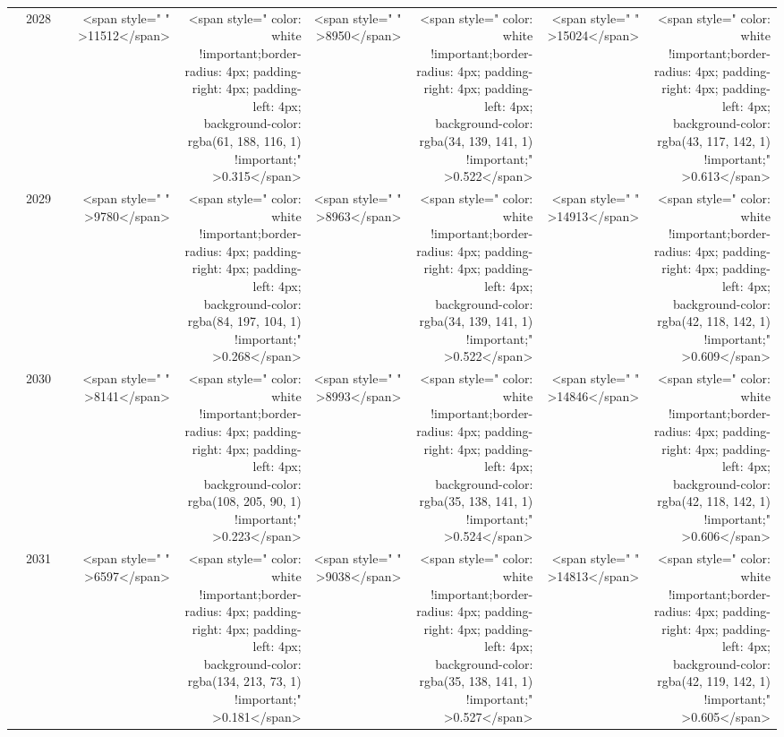 \begin{table}
\begin{tabular}[t]{>{}l|l>{}rr>{}r|rrrr}
 & 2028 & \cellcolor[HTML]{747475}{\textcolor{white}{3073}} & <span style="     " >11512</span> & <span style="     color: white !important;border-radius: 4px; padding-right: 4px; padding-left: 4px; background-color: rgba(61, 188, 116, 1) !important;" >0.315</span> & <span style="     " >8950</span> & <span style="     color: white !important;border-radius: 4px; padding-right: 4px; padding-left: 4px; background-color: rgba(34, 139, 141, 1) !important;" >0.522</span> & <span style="     " >15024</span> & <span style="     color: white !important;border-radius: 4px; padding-right: 4px; padding-left: 4px; background-color: rgba(43, 117, 142, 1) !important;" >0.613</span>\\

 & 2029 & \cellcolor[HTML]{767676}{\textcolor{white}{3028}} & <span style="     " >9780</span> & <span style="     color: white !important;border-radius: 4px; padding-right: 4px; padding-left: 4px; background-color: rgba(84, 197, 104, 1) !important;" >0.268</span> & <span style="     " >8963</span> & <span style="     color: white !important;border-radius: 4px; padding-right: 4px; padding-left: 4px; background-color: rgba(34, 139, 141, 1) !important;" >0.522</span> & <span style="     " >14913</span> & <span style="     color: white !important;border-radius: 4px; padding-right: 4px; padding-left: 4px; background-color: rgba(42, 118, 142, 1) !important;" >0.609</span>\\

 & 2030 & \cellcolor[HTML]{777776}{\textcolor{white}{2984}} & <span style="     " >8141</span> & <span style="     color: white !important;border-radius: 4px; padding-right: 4px; padding-left: 4px; background-color: rgba(108, 205, 90, 1) !important;" >0.223</span> & <span style="     " >8993</span> & <span style="     color: white !important;border-radius: 4px; padding-right: 4px; padding-left: 4px; background-color: rgba(35, 138, 141, 1) !important;" >0.524</span> & <span style="     " >14846</span> & <span style="     color: white !important;border-radius: 4px; padding-right: 4px; padding-left: 4px; background-color: rgba(42, 118, 142, 1) !important;" >0.606</span>\\

 & 2031 & \cellcolor[HTML]{787777}{\textcolor{white}{2942}} & <span style="     " >6597</span> & <span style="     color: white !important;border-radius: 4px; padding-right: 4px; padding-left: 4px; background-color: rgba(134, 213, 73, 1) !important;" >0.181</span> & <span style="     " >9038</span> & <span style="     color: white !important;border-radius: 4px; padding-right: 4px; padding-left: 4px; background-color: rgba(35, 138, 141, 1) !important;" >0.527</span> & <span style="     " >14813</span> & <span style="     color: white !important;border-radius: 4px; padding-right: 4px; padding-left: 4px; background-color: rgba(42, 119, 142, 1) !important;" >0.605</span>\\


\end{tabular}
\end{table}
